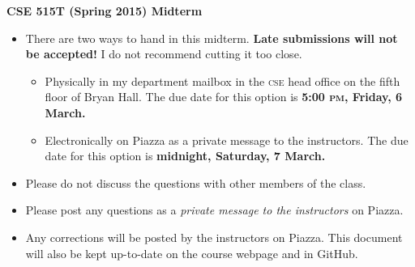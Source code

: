 \documentclass{article}
\newcommand{\acro}[1]{\textsc{\MakeLowercase{#1}}}
\begin{document}
{\large \textbf{CSE 515T (Spring 2015) Midterm}}
\begin{itemize}
\item
  There are two ways to hand in this midterm.  \textbf{Late
    submissions will not be accepted!}  I do not recommend cutting it
  too close.
  \begin{itemize}
  \item Physically in my department mailbox in the \acro{CSE} head
    office on the fifth floor of Bryan Hall.  The due date for this
    option is \textbf{5:00 \acro{PM}, Friday, 6 March.}
  \item Electronically on Piazza as a private message to the
    instructors. The due date for this option is \textbf{midnight,
      Saturday, 7 March.}
  \end{itemize}
\item
  Please do not discuss the questions with other members of the class.
\item
  Please post any questions as a \emph{private message to the
    instructors} on Piazza.
\item
  Any corrections will be posted by the instructors on Piazza. This
  document will also be kept up-to-date on the course webpage and in
  GitHub.
\end{itemize}

\clearpage
\end{document}
